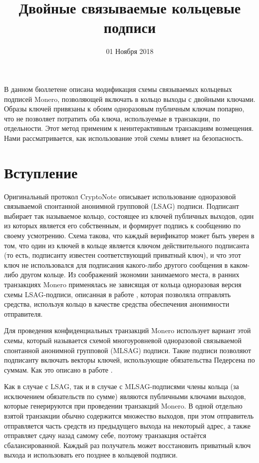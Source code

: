 \documentclass{mrl}
\title{Двойные связываемые кольцевые подписи}
\date{01 Ноября 2018}
\begin{document}
\begin{center}
{}
\end{center}

В данном бюллетене описана модификация схемы связываемых кольцевых подписей Monero, позволяющей включать в кольцо выходы с двойными ключами. Образы ключей привязаны к обоим одноразовым публичным ключам попарно, что не позволяет потратить оба ключа, используемые в транзакции, по отдельности. Этот метод применим к неинтерактивным транзакциям возмещения. Нами рассматривается, как использование этой схемы влияет на безопасность.​

\section{Вступление}
Оригинальный протокол CryptoNote описывает использование одноразовой связываемой спонтанной анонимной групповой (LSAG) подписи. Подписант выбирает так называемое кольцо, состоящее из ключей публичных выходов, один из которых является его собственным, и формирует подпись к сообщению по своему усмотрению. Схема такова, что каждый верификатор может быть уверен в том, что один из ключей в кольце является ключом действительного подписанта (то есть, подписанту известен соответствующий приватный ключ), и что этот ключ не использовался для подписания какого-либо другого сообщения в каком-либо другом кольце. Из соображений экономии занимаемого места, в ранних транзакциях Monero применялась не зависящая от кольца одноразовая версия схемы LSAG-подписи, описанная в работе \cite{liu}, которая позволяла отправлять средства, используя кольцо в качестве средства обеспечения анонимности отправителя.

Для проведения конфиденциальных транзакций Monero использует вариант этой схемы, который называется схемой многоуровневой одноразовой связываемой спонтанной анонимной групповой (MLSAG) подписи. Такие подписи позволяют подписанту включать векторы ключей, использующие обязательства Педерсена по суммам. Как это описано в работе \cite{shen}.

Как в случае с LSAG, так и в случае с MLSAG-подписями члены кольца (за исключением обязательств по сумме) являются публичными ключами выходов, которые генерируются при проведении транзакций Monero. В одной отдельно взятой транзакции обычно содержится множество выходов, при этом отправитель отправляется часть средств из предыдущего выхода на некоторый адрес, а также отправляет сдачу назад самому себе, поэтому транзакция остаётся сбалансированной. Каждый раз получатель может восстановить приватный ключ выхода и использовать его позднее в кольцевой подписи.
\end{document}
